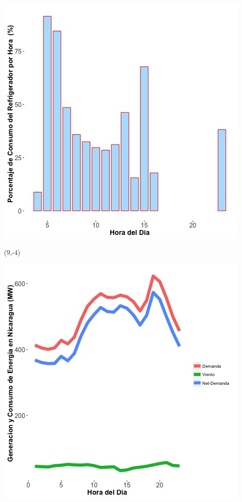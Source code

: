 \documentclass{article}\usepackage[]{graphicx}\usepackage[]{color}
\newenvironment{knitrout}{}{} %
\begin{document}
\begin{knitrout}
\color{fgcolor}
\includegraphics[scale=0.65]{figure/A19_fridge_energy_pct.jpg} 
\end{knitrout}

 \begin{textblock}{1}(9,-4)
\begin{minipage}{20em}
\begingroup

\endgroup
\end{minipage}
\end{textblock}

\vspace{20cm}

\begin{knitrout}
\color{fgcolor}
\includegraphics[scale=0.65]{figure/gridplot1.jpg} 
\end{knitrout}
\end{document}
